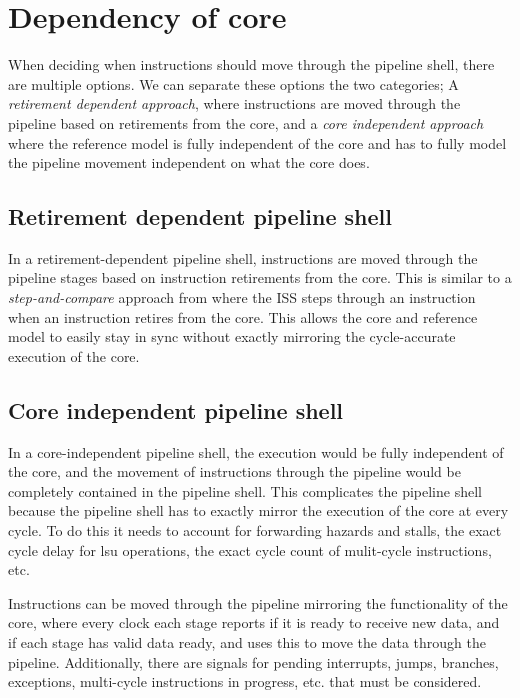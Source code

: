 \section{Dependency of core}

When deciding when instructions should move through the pipeline shell, there are multiple options. We can separate these options the two categories; A \textit{retirement dependent approach}, where instructions are moved through the pipeline based on retirements from the core, and a \textit{core independent approach} where the reference model is fully independent of the core and has to fully model the pipeline movement independent on what the core does. 

\subsection{Retirement dependent pipeline shell}

In a retirement-dependent pipeline shell, instructions are moved through the pipeline stages based on instruction retirements from the core. This is similar to a \textit{step-and-compare} approach from  where the ISS steps through an instruction when an instruction retires from the core. This allows the core and reference model to easily stay in sync without exactly mirroring the cycle-accurate execution of the core.


\subsection{Core independent pipeline shell}

In a core-independent pipeline shell, the execution would be fully independent of the core, and the movement of instructions through the pipeline would be completely contained in the pipeline shell. This complicates the pipeline shell because the pipeline shell has to exactly mirror the execution of the core at every cycle. To do this it needs to account for forwarding hazards and stalls, the exact cycle delay for \acrshort{lsu} operations, the exact cycle count of mulit-cycle instructions, etc.

Instructions can be moved through the pipeline mirroring the functionality of the core, where every clock each stage reports if it is ready to receive new data, and if each stage has valid data ready, and uses this to move the data through the pipeline. Additionally, there are signals for pending interrupts, jumps, branches, exceptions, multi-cycle instructions in progress, etc. that must be considered. 



